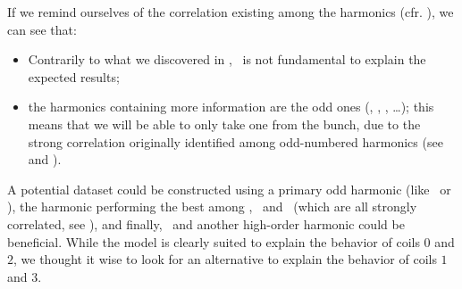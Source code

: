 \noindent If we remind ourselves of the correlation existing among the harmonics (cfr. ), we can see that:
\begin{itemize}
	\item Contrarily to what we discovered in , \an[2]\ is not
	      fundamental to explain the expected results;
	\item the harmonics containing more information are the odd ones (\an[1], \an[3], \an[5],
	      \ldots); this means that we will be able to only take one from the bunch, due to the
	      strong correlation originally identified among odd-numbered harmonics (see
		 and ).
\end{itemize}
A potential dataset could be constructed using a primary odd harmonic (like \an[1]\ or \an[3]), the
harmonic performing the best among \an[4], \an[8]\ and \an[12]\ (which are all strongly correlated,
see ), and finally, \an[2]\ and another high-order harmonic could be beneficial. While
the model is clearly suited to explain the behavior of coils $0$ and $2$, we thought it wise to
look for an alternative to explain the behavior of coils $1$ and $3$.
